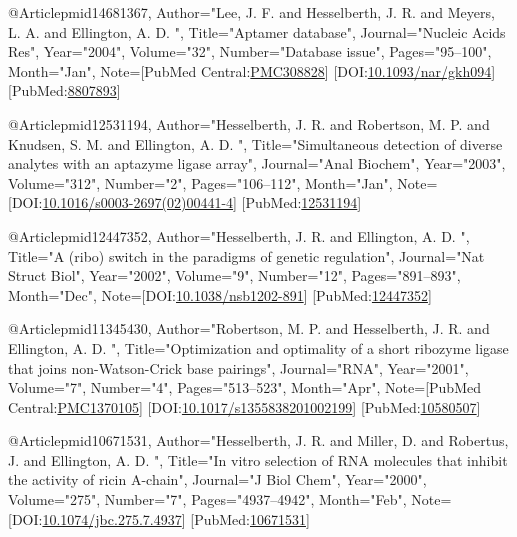 @Article{pmid14681367,
   Author="Lee, J. F.  and Hesselberth, J. R.  and Meyers, L. A.  and Ellington, A. D. ",
   Title="{{A}ptamer database}",
   Journal="Nucleic Acids Res",
   Year="2004",
   Volume="32",
   Number="Database issue",
   Pages="95--100",
   Month="Jan",
   Note={[PubMed Central:\href{https://www.ncbi.nlm.nih.gov/pmc/articles/PMC308828}{PMC308828}] [DOI:\href{https://dx.doi.org/10.1093/nar/gkh094}{10.1093/nar/gkh094}] [PubMed:\href{https://www.ncbi.nlm.nih.gov/pubmed/8807893}{8807893}] }
}

@Article{pmid12531194,
   Author="Hesselberth, J. R.  and Robertson, M. P.  and Knudsen, S. M.  and Ellington, A. D. ",
   Title="{{S}imultaneous detection of diverse analytes with an aptazyme ligase array}",
   Journal="Anal Biochem",
   Year="2003",
   Volume="312",
   Number="2",
   Pages="106--112",
   Month="Jan",
   Note={[DOI:\href{https://dx.doi.org/10.1016/s0003-2697(02)00441-4}{10.1016/s0003-2697(02)00441-4}] [PubMed:\href{https://www.ncbi.nlm.nih.gov/pubmed/12531194}{12531194}] }
}

@Article{pmid12447352,
   Author="Hesselberth, J. R.  and Ellington, A. D. ",
   Title="{{A} (ribo) switch in the paradigms of genetic regulation}",
   Journal="Nat Struct Biol",
   Year="2002",
   Volume="9",
   Number="12",
   Pages="891--893",
   Month="Dec",
   Note={[DOI:\href{https://dx.doi.org/10.1038/nsb1202-891}{10.1038/nsb1202-891}] [PubMed:\href{https://www.ncbi.nlm.nih.gov/pubmed/12447352}{12447352}] }
}

@Article{pmid11345430,
   Author="Robertson, M. P.  and Hesselberth, J. R.  and Ellington, A. D. ",
   Title="{{O}ptimization and optimality of a short ribozyme ligase that joins non-{W}atson-{C}rick base pairings}",
   Journal="RNA",
   Year="2001",
   Volume="7",
   Number="4",
   Pages="513--523",
   Month="Apr",
   Note={[PubMed Central:\href{https://www.ncbi.nlm.nih.gov/pmc/articles/PMC1370105}{PMC1370105}] [DOI:\href{https://dx.doi.org/10.1017/s1355838201002199}{10.1017/s1355838201002199}] [PubMed:\href{https://www.ncbi.nlm.nih.gov/pubmed/10580507}{10580507}] }
}

@Article{pmid10671531,
   Author="Hesselberth, J. R.  and Miller, D.  and Robertus, J.  and Ellington, A. D. ",
   Title="{{I}n vitro selection of {R}{N}{A} molecules that inhibit the activity of ricin {A}-chain}",
   Journal="J Biol Chem",
   Year="2000",
   Volume="275",
   Number="7",
   Pages="4937--4942",
   Month="Feb",
   Note={[DOI:\href{https://dx.doi.org/10.1074/jbc.275.7.4937}{10.1074/jbc.275.7.4937}] [PubMed:\href{https://www.ncbi.nlm.nih.gov/pubmed/10671531}{10671531}] }
}

